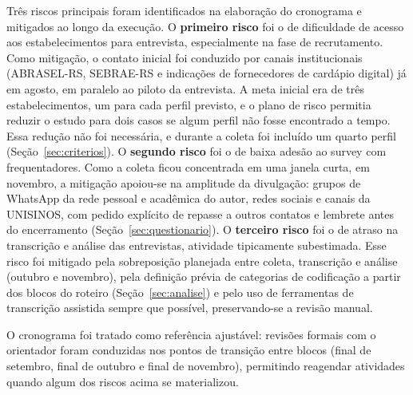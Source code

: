Três riscos principais foram identificados na elaboração do cronograma e mitigados ao longo da execução. O \textbf{primeiro risco} foi o de dificuldade de acesso aos estabelecimentos para entrevista, especialmente na fase de recrutamento. Como mitigação, o contato inicial foi conduzido por canais institucionais (ABRASEL-RS, SEBRAE-RS e indicações de fornecedores de cardápio digital) já em agosto, em paralelo ao piloto da entrevista. A meta inicial era de três estabelecimentos, um para cada perfil previsto, e o plano de risco permitia reduzir o estudo para dois casos se algum perfil não fosse encontrado a tempo. Essa redução não foi necessária, e durante a coleta foi incluído um quarto perfil (Seção~\ref{sec:criterios}). O \textbf{segundo risco} foi o de baixa adesão ao survey com frequentadores. Como a coleta ficou concentrada em uma janela curta, em novembro, a mitigação apoiou-se na amplitude da divulgação: grupos de WhatsApp da rede pessoal e acadêmica do autor, redes sociais e canais da UNISINOS, com pedido explícito de repasse a outros contatos e lembrete antes do encerramento (Seção~\ref{sec:questionario}). O \textbf{terceiro risco} foi o de atraso na transcrição e análise das entrevistas, atividade tipicamente subestimada. Esse risco foi mitigado pela sobreposição planejada entre coleta, transcrição e análise (outubro e novembro), pela definição prévia de categorias de codificação a partir dos blocos do roteiro (Seção~\ref{sec:analise}) e pelo uso de ferramentas de transcrição assistida sempre que possível, preservando-se a revisão manual.

O cronograma foi tratado como referência ajustável: revisões formais com o orientador foram conduzidas nos pontos de transição entre blocos (final de setembro, final de outubro e final de novembro), permitindo reagendar atividades quando algum dos riscos acima se materializou.
